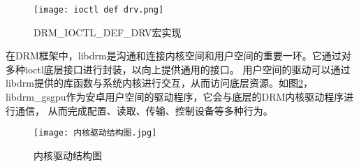 \begin{figure}[h]
  \centering
  \texttt{[image: ioctl def drv.png]}
  \caption{DRM\_IOCTL\_DEF\_DRV宏实现}
  \label{fig:ioctl def drv}
\end{figure}




在DRM框架中，libdrm是沟通和连接内核空间和用户空间的重要一环。它通过对多种ioctl底层接口进行封装，以向上提供通用的接口。
用户空间的驱动可以通过libdrm提供的库函数与系统内核进行交互，从而访问底层资源。如图\ref{fig:内核驱动结构图}，
libdrm\_gsgpu作为安卓用户空间的驱动程序，它会与底层的DRM内核驱动程序进行通信，
从而完成配置、读取、传输、控制设备等多种行为。

\begin{figure}[h]
  \centering
  \texttt{[image: 内核驱动结构图.jpg]}
  \caption{内核驱动结构图}
  \label{fig:内核驱动结构图}
\end{figure}

